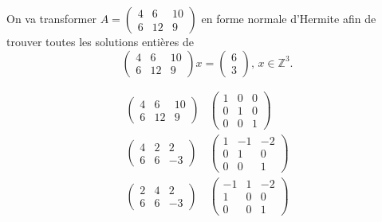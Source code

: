   \begin{example}
    \label{exe:29}
    On va transformer
    $A = \left(\begin{matrix}4 & 6 & 10\\6 & 12 &
        9\end{matrix}\right)$ en forme normale d'Hermite afin de
    trouver toutes les solutions entières de
    \begin{equation}
      \label{eq:46}
      \left(\begin{matrix}4 & 6 & 10\\6 & 12 & 9\end{matrix}\right) x =
      \begin{pmatrix}
        6 \\ 3
      \end{pmatrix}, \, x ∈ ℤ^3. 
    \end{equation}
    
    \begin{equation}
      \label{eq:45}
      \begin{array}{cc}
        \left(\begin{matrix}4 & 6 & 10\\6 & 12 & 9\end{matrix}\right) &  
                                                                        \left(\begin{matrix}1 & 0 & 0\\0 & 1 & 0\\0 & 0 & 1\end{matrix}\right) \\

\left(\begin{matrix}4 & 2 & 2\\6 & 6 & -3\end{matrix}\right) &  
\left(\begin{matrix}1 & -1 & -2\\0 & 1 & 0\\0 & 0 & 1\end{matrix}\right) \\

\left(\begin{matrix}2 & 4 & 2\\6 & 6 & -3\end{matrix}\right) &
\left(\begin{matrix}-1 & 1 & -2\\1 & 0 & 0\\0 & 0 & 1\end{matrix}\right)\\


\end{array}
\end{equation}
\end{example}
